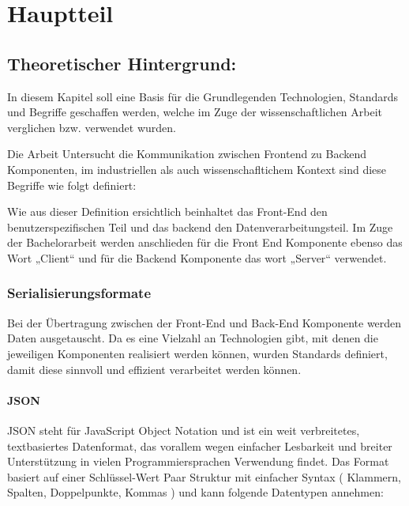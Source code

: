 \chapter{Hauptteil}
\label{chap:intro}
\chapterstart

\section{Theoretischer Hintergrund:}

In diesem Kapitel soll eine Basis für die Grundlegenden Technologien, Standards und Begriffe geschaffen werden, welche im Zuge der wissenschaftlichen Arbeit verglichen bzw. verwendet wurden.

Die Arbeit Untersucht die Kommunikation zwischen Frontend zu Backend Komponenten, im industriellen als auch wissenschafltichem Kontext sind diese Begriffe wie folgt definiert:

{\cite{awsfrontendbackend}}

Wie aus dieser Definition ersichtlich beinhaltet das Front-End den benutzerspezifischen Teil und das backend den Datenverarbeitungsteil. Im Zuge der Bachelorarbeit werden anschlieden für die Front End Komponente ebenso das Wort „Client“ und für die Backend Komponente das wort „Server“ verwendet.

\subsection{Serialisierungsformate}
Bei der Übertragung zwischen der Front-End und Back-End Komponente werden Daten ausgetauscht. Da es eine Vielzahl an Technologien gibt, mit denen die jeweiligen Komponenten realisiert werden können, wurden Standards definiert, damit diese sinnvoll und effizient verarbeitet werden können.

\subsubsection{JSON}
JSON steht für JavaScript Object Notation und ist ein weit verbreitetes, textbasiertes Datenformat, das vorallem wegen einfacher Lesbarkeit und breiter Unterstützung in vielen Programmiersprachen Verwendung findet. Das Format basiert auf einer Schlüssel-Wert Paar Struktur mit einfacher Syntax ( Klammern, Spalten, Doppelpunkte, Kommas ) und kann folgende Datentypen annehmen:

